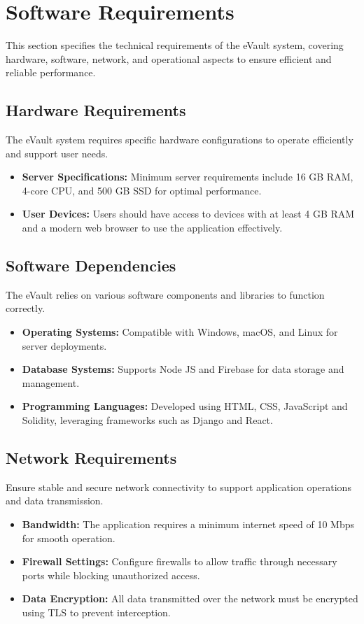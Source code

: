 \documentclass[12pt,a4paper]{report}
\begin{document}
   \section{Software Requirements}
   
   This section specifies the technical requirements of the eVault system, covering hardware, software, network, and operational aspects to ensure efficient and reliable performance.
   
   \subsection{Hardware Requirements}
   The eVault system requires specific hardware configurations to operate efficiently and support user needs.
   \begin{itemize}
       \item \textbf{Server Specifications:} Minimum server requirements include 16 GB RAM, 4-core CPU, and 500 GB SSD for optimal performance.
       \item \textbf{User Devices:} Users should have access to devices with at least 4 GB RAM and a modern web browser to use the application effectively.
   \end{itemize}
   
   \subsection{Software Dependencies}
   The eVault relies on various software components and libraries to function correctly.
   \begin{itemize}
       \item \textbf{Operating Systems:} Compatible with Windows, macOS, and Linux for server deployments.
       \item \textbf{Database Systems:} Supports Node JS\cite{nodedocs} and Firebase for data storage and management.
       \item \textbf{Programming Languages:} Developed using HTML\cite{duckett2011html}, CSS\cite{meyer2017css}, JavaScript\cite{hav2018eloquent} and Solidity\cite{soliditydocs}, leveraging frameworks such as Django and React.
   \end{itemize}
   
   \subsection{Network Requirements}
   Ensure stable and secure network connectivity to support application operations and data transmission.
   \begin{itemize}
       \item \textbf{Bandwidth:} The application requires a minimum internet speed of 10 Mbps for smooth operation.
       \item \textbf{Firewall Settings:} Configure firewalls to allow traffic through necessary ports while blocking unauthorized access.
       \item \textbf{Data Encryption:} All data transmitted over the network must be encrypted using TLS to prevent interception.
   \end{itemize}
\end{document}

